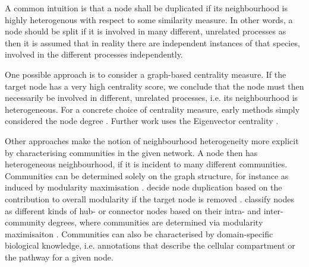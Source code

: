 \documentclass[
	fontsize=10pt, %
	twoside=false, %
	secnumdepth=1, %
  toc=indentunnumbered %
]{kaobook}
\begin{document}
%



A common intuition is that a node shall be duplicated if its
neighbourhood is highly heterogenous with respect to some similarity measure. In other words, a
node should be split if it is involved in many different, unrelated processes
as then it is assumed that in reality there are independent instances of that
species, involved in the different processes independently.

One possible approach is to consider a graph-based centrality measure. If the
target node has a very high centrality score, we conclude that 
the node must then necessarily be involved in different, unrelated processes, i.e.
its neighbourhood is heterogeneous. For a concrete choice of centrality measure,
early methods simply considered the node degree
\cite{ma_ReconstructionMetabolicNetworks_2003,schuster_exploring_2002}.
Further work uses the Eigenvector centrality \cite{manipur_clustering_2020}.

Other approaches make the notion of neighbourhood heterogeneity more explicit by
characterising communities in the given network. A node then has heterogeneous
neighbourhood, if it is incident to many different communities. Communities can
be determined solely on the graph structure, for instance as induced by
modularity maximisation \cite{newman_modularity_2006}.
\citeauthor{huss_CurrencyCommodityMetabolites_2007} decide node duplication
based on the contribution to overall modularity if the target node is removed
\cite{huss_CurrencyCommodityMetabolites_2007}.
\citeauthor{guimera_FunctionalCartographyComplex_2005} classify nodes as
different kinds of hub- or connector nodes based on their intra- and
inter-community degrees, where communities are determined via modularity maximisaiton
\cite{guimera_FunctionalCartographyComplex_2005}. Communities can also be
characterised by domain-specific biological knowledge, i.e. annotations that
describe the cellular compartment \cite{manipur_clustering_2020} or the pathway 
\cite{rohrschneider_NovelGridBasedVisualization_2010}
\cite{joshi-tope_ReactomeKnowledgebaseBiological_2005} for a given node.
\end{document}
